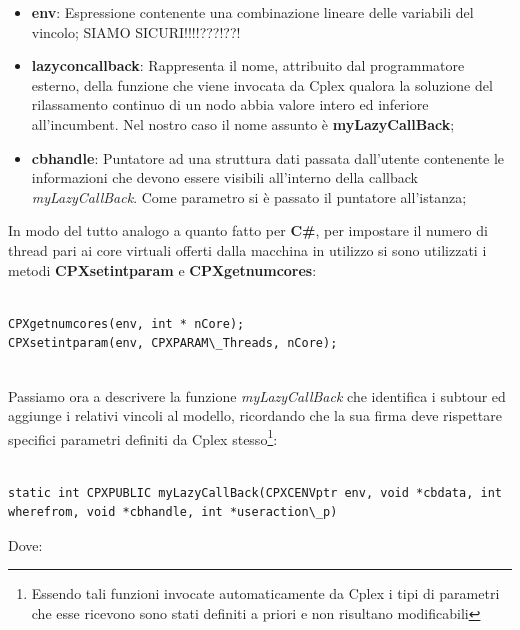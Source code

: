 \documentclass[11pt]{article}
\begin{document}
\begin{itemize}
    \item \textbf{env}: Espressione contenente una combinazione lineare delle variabili del vincolo; SIAMO SICURI!!!!???!??!
    \item \textbf{lazyconcallback}: Rappresenta il nome, attribuito dal programmatore esterno, della funzione che viene invocata da Cplex qualora la soluzione del rilassamento continuo di un nodo abbia valore intero ed inferiore all'incumbent. Nel nostro caso il nome assunto è \textbf{myLazyCallBack};
    \item \textbf{cbhandle}: Puntatore ad una struttura dati passata dall'utente contenente le informazioni che devono essere visibili all'interno della callback \textit{myLazyCallBack}. Come parametro si è passato il puntatore all'istanza;
\end{itemize}

In modo del tutto analogo a quanto fatto per \textbf{C\#}, per impostare il numero di thread pari ai core virtuali offerti dalla macchina in utilizzo si sono utilizzati i metodi \textbf{CPXsetintparam} e \textbf{CPXgetnumcores}:

\begin{lstlisting}

CPXgetnumcores(env, int * nCore);
CPXsetintparam(env, CPXPARAM\_Threads, nCore);


\end{lstlisting}

Passiamo ora a descrivere la funzione \textit{myLazyCallBack} che identifica i subtour ed aggiunge i relativi vincoli al modello, ricordando che la sua firma deve rispettare specifici parametri definiti da Cplex stesso\footnote{Essendo tali funzioni invocate automaticamente da Cplex i tipi di parametri che esse ricevono sono stati definiti a priori e non risultano modificabili}:

\begin{lstlisting}

static int CPXPUBLIC myLazyCallBack(CPXCENVptr env, void *cbdata, int wherefrom, void *cbhandle, int *useraction\_p)

\end{lstlisting}

Dove:
\end{document}
